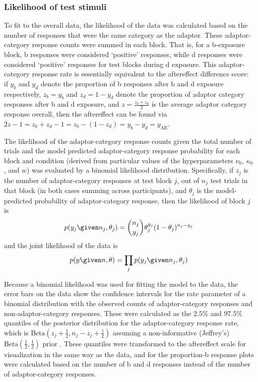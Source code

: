 \subsubsection{Likelihood of test stimuli}
\label{sec:likel-test-stim}

To fit to the overall data, the likelihood of the data was calculated based on the number of responses that were the same category as the adaptor.  These adaptor-category response counts were summed in each block.  That is, for a \ph b-exposure block, \ph b responses were considered `positive' responses, while \ph d responses were considered `positive' responses for test blocks during \ph d exposure.  This adaptor-category response rate is essentially equivalent to the aftereffect difference score: if $y_b$ and $y_d$ denote the proportion of \ph b responses after \ph b and \ph d exposure respectively, $z_b=y_b$ and $z_d = 1-y_d$ denote the proportion of adaptor category responses after \ph b and \ph d exposure, and $z = \frac{z_b+z_d}{2}$ is the average adaptor category response overall, then the aftereffect can be found via $2z - 1 = z_b+z_d - 1= z_b - (1-z_d)  = y_b - y_d = y_\mathrm{AE}$.

The likelihood of the adaptor-category response counts given the total number of trials and the model predicted adaptor-category response probability for each block and condition (derived from particular values of the hyperparameters $\nu_0$, $\kappa_0$, and $w$) was evaluated by a binomial likelihood distribution.  Specifically, if $z_j$ is the number of adaptor-category responses at test block $j$, out of $n_j$ test trials in that block (in both cases summing across participants), and $\theta_j$ is the model-predicted probability of adaptor-category response, then the likelihood of block $j$ is
\begin{equation}
  p(y_j \given n_j, \theta_j) = \binom{n_j}{y_j} \theta_j ^ {y_j} (1-\theta_j)^{n_j - y_j}
\end{equation}
and the joint likelihood of the data is
\begin{equation}
  p(y \given n, \theta) = \prod_j p(y_j \given n_j,\theta_j)
\end{equation}

Because a binomial likelihood was used for fitting the model to the data, the error bars on the data show the confidence intervals for the rate parameter of a binomial distribution with the observed counts of adaptor-category responses and non-adaptor-category responses.  These were calculated as the $2.5\%$ and $97.5\%$ quantiles of the posterior distribution for the adaptor-category response rate, which is $\mathrm{Beta} (z_j+\frac{1}{2}, n_j-z_j+\frac{1}{2})$ assuming a non-informative (Jeffrey's) $\mathrm{Beta}(\frac{1}{2}, \frac{1}{2})$ prior \cite{Gelman2003}.  These quantiles were transformed to the aftereffect scale for visualization in the same way as the data, and for the proportion-\ph b response plots were calculated based on the number of \ph b and \ph d responses instead of the number of adaptor-category responses.

